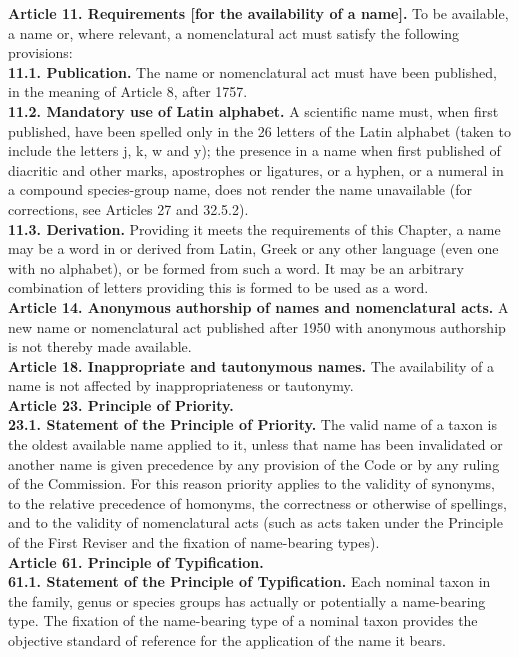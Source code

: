 \documentclass[letterpaper, 11pt]{article}
\begin{document}
\noindent{}\textbf{Article 11. Requirements [for the availability of a name].} To be available, a name or, where relevant, a nomenclatural act must satisfy the following provisions:\\
\noindent{}\textbf{11.1. Publication.} The name or nomenclatural act must have been published, in the meaning of Article 8, after 1757.\\
\noindent{}\textbf{11.2. Mandatory use of Latin alphabet.} A scientific name must, when first published, have been spelled only in the 26 letters of the Latin alphabet (taken to include the letters j, k, w and y); the presence in a name when first published of diacritic and other marks, apostrophes or ligatures, or a hyphen, or a numeral in a compound species-group name, does not render the name unavailable (for corrections, see Articles 27 and 32.5.2).\\
\noindent{}\textbf{11.3. Derivation.} Providing it meets the requirements of this Chapter, a name may be a word in or derived from Latin, Greek or any other language (even one with no alphabet), or be formed from such a word. It may be an arbitrary combination of letters providing this is formed to be used as a word.\\

\noindent{}\textbf{Article 14. Anonymous authorship of names and nomenclatural acts.} A new name or nomenclatural act published after 1950 with anonymous authorship is not thereby made available.\\

\noindent{}\textbf{Article 18. Inappropriate and tautonymous names.} The availability of a name is not affected by inappropriateness or tautonymy.\\

\noindent{}\textbf{Article 23. Principle of Priority.}\\
\noindent{}\textbf{23.1. Statement of the Principle of Priority.} The valid name of a taxon is the oldest available name applied to it, unless that name has been invalidated or another name is given precedence by any provision of the Code or by any ruling of the Commission. For this reason priority applies to the validity of synonyms, to the relative precedence of homonyms, the correctness or otherwise of spellings, and to the validity of nomenclatural acts (such as acts taken under the Principle of the First Reviser and the fixation of name-bearing types).\\

\noindent{}\textbf{Article 61. Principle of Typification.}\\
\noindent{}\textbf{61.1. Statement of the Principle of Typification.} Each nominal taxon in the family, genus or species groups has actually or potentially a name-bearing type. The fixation of the name-bearing type of a nominal taxon provides the objective standard of reference for the application of the name it bears.\\
\end{document}
